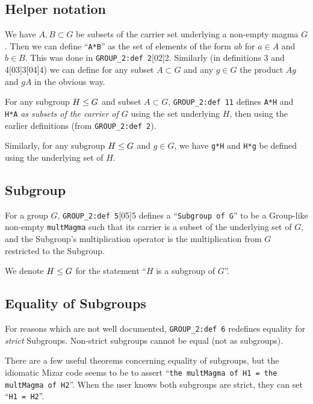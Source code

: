 \subsection{Helper notation}
We have $A,B\subset G$ be subsets of the carrier set underlying a
non-empty magma $G$. Then we can define ``\verb#A*B#'' as the set of
elements of the form $ab$ for $a\in A$ and $b\in B$. This was done in
\verb#GROUP_2:def 2#[02]{2}. Similarly (in definitions
3 and 4[03]{3}[04]{4}) we can define
for any subset $A\subset G$ and any $g\in G$ the product $Ag$ and $gA$
in the obvious way.

For any subgroup $H\leq G$ and subset $A\subset G$,
\verb#GROUP_2:def 11# defines \verb$A*H$ and
\verb$H*A$ \emph{as subsets of the carrier of $G$} using the set
underlying $H$, then using the earlier definitions (from
\verb#GROUP_2:def 2#).

Similarly, for any subgroup $H\leq G$ and $g\in G$, we have
\verb#g*H# and \verb#H*g# be defined using the underlying set of $H$.

\subsection{Subgroup}
For a group $G$, \verb#GROUP_2:def 5#[05]{5} defines a
``\verb#Subgroup of G#'' to be a Group-like non-empty \verb#multMagma#
such that its carrier is a subset of the underlying set of $G$, and the
Subgroup's multiplication operator is the multiplication from $G$
restricted to the Subgroup.

\begin{remark}[Notation]
We denote $H\leq G$ for the statement ``$H$ is a subgroup of $G$''.
\end{remark}

\subsection{Equality of Subgroups}\label{par:introduction:subgroup-equality}
For reasons which are not well documented, \verb#GROUP_2:def 6#
redefines equality for \emph{strict} Subgroups. Non-strict subgroups
cannot be equal (not as subgroups).

There are a few useful theorems
concerning equality of subgroups, but the idiomatic Mizar code seems to
be to assert ``\texttt{the multMagma of H1 = the multMagma of H2}''.
When the user knows both subgroups are strict, they can set ``\texttt{H1 = H2}''.




